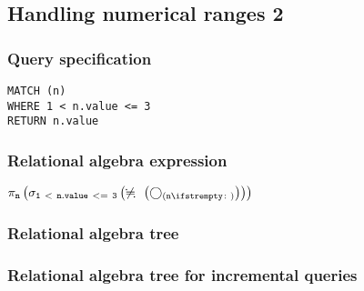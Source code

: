 \subsection{Handling numerical ranges 2}

\subsubsection*{Query specification}

\begin{lstlisting}
MATCH (n)
WHERE 1 < n.value <= 3
RETURN n.value
\end{lstlisting}

\subsubsection*{Relational algebra expression}

$\projection{\var{n}} \left(\selection{\mathtt{1~<~n.value~<=~3}} \left(\alldifferent{} \left(\getvertices{n}{}\right)\right)\right)$

\subsubsection*{Relational algebra tree}


\subsubsection*{Relational algebra tree for incremental queries}


